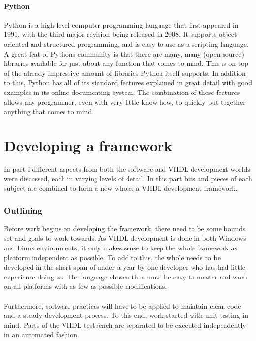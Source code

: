 \documentclass[11pt,british]{article}
\begin{document}
\subsection{Python}
Python is a high-level computer programming language that first appeared in 1991, with the third major revision being released in 2008. It supports object-oriented and structured programming, and is easy to use as a scripting language. A great feat of Pythons community is that there are many, many (open source) libraries available for just about any function that comes to mind. This is on top of the already impressive amount of libraries Python itself supports. In addition to this, Python has all of its standard features explained in great detail with good examples in its online documenting system. The combination of these features allows any programmer, even with very little know-how, to quickly put together anything that comes to mind.


\newpage
\part{Developing a framework}
In part I different aspects from both the software and \gls{VHDL} development worlds were discussed, each in  varying levels of detail. In this part bits and pieces of each subject are combined to form a new whole, a VHDL development framework.

\section{Outlining}
Before work begins on developing the framework, there need to be some bounds set and goals to work towards. As VHDL development is done in both Windows and Linux environments, it only makes sense to keep the whole framework as platform independent as possible. To add to this, the whole needs to be developed in the short span of under a year by one developer who has had little experience doing so. The language chosen thus must be easy to master and work on all platforms with as few as possible modifications.\\
\\
Furthermore, software practices will have to be applied to maintain clean code and a steady development process. To this end, work started with unit testing in mind. Parts of the VHDL testbench are separated to be executed independently in an automated fashion.
\end{document}
